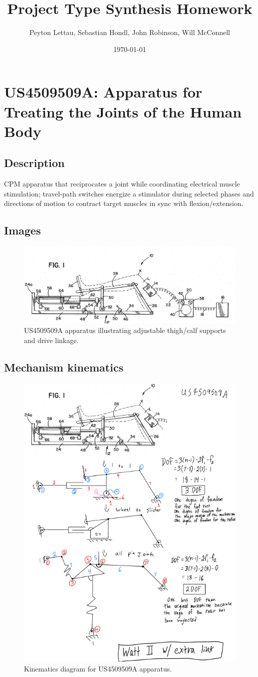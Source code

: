\documentclass[11pt]{article}
\title{Project Type Synthesis Homework}
\author{Peyton Lettau, Sebastian Hondl, John Robinson, Will McConnell}
\date{\today}
\begin{document}
\maketitle

\tableofcontents
\newpage

\section{US4509509A: Apparatus for Treating the Joints of the Human Body}
\subsection{Description}
CPM apparatus that reciprocates a joint while coordinating electrical muscle stimulation; travel-path switches energize a stimulator during selected phases and directions of motion to contract target muscles in sync with flexion/extension.
\subsection{Images}
\begin{figure}[H]
  \centering
  \includegraphics[width=0.54\linewidth]{US4509509.png}
  \caption{US4509509A apparatus illustrating adjustable thigh/calf supports and drive linkage.}
  \label{fig:US4509509A}
\end{figure}

\subsection{Mechanism kinematics}
\begin{figure}[H]
  \centering
  \includegraphics[width=0.54\linewidth]{../Kinematic Mechanism Images/4509509.png}
  \caption{Kinematics diagram for US4509509A apparatus.}
  \label{fig:US4509509A_kinematics}
\end{figure}
\end{document}
